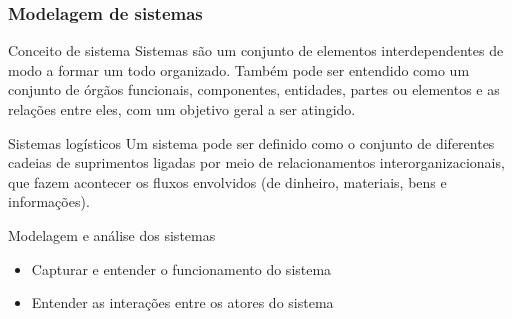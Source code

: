 \documentclass[10pt]{beamer}
\begin{document}
\begin{frame}
	
	\frametitle{Modelagem de sistemas} 
	
	\begin{block}{Conceito de sistema}
		Sistemas são um conjunto de elementos interdependentes de modo a formar um todo organizado. Também pode ser entendido como um conjunto de órgãos funcionais, componentes, entidades, partes ou elementos e as relações entre eles, com um objetivo geral a ser atingido.
	\end{block}

	\begin{block}{Sistemas logísticos}
		Um sistema pode ser definido como o conjunto de diferentes cadeias de suprimentos ligadas por meio de relacionamentos interorganizacionais, que fazem acontecer os fluxos envolvidos (de dinheiro, materiais, bens e informações).
		
	\end{block}
	
	Modelagem e análise dos sistemas
	
	\begin{itemize}
		\item Capturar e entender o funcionamento do sistema
		\item Entender as interações entre os atores do sistema
	\end{itemize}
	
\end{frame}
\end{document}
